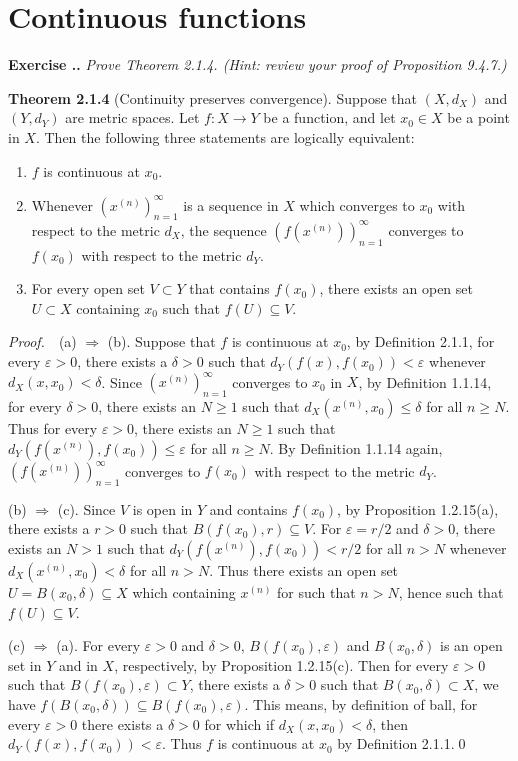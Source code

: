 \documentclass{book}
\newcommand{\pff}{\vspace{.25em}\noindent\emph{Proof.}~~}
\newcommand{\titl}[1]{\noindent\textbf{#1}}
\newcounter{Exercise}[section]
\renewcommand{\theExercise}{\thesection.\arabic{Exercise}.}
\newcommand{\new}{\vspace{1.5em}\noindent\textbf{Exercise \stepcounter{Exercise}\textbf{\theExercise}} }
\begin{document}
\section{Continuous functions}

\new\emph{Prove Theorem 2.1.4. (Hint: review your proof of Proposition 9.4.7.)}

\begin{framed}
\titl{Theorem 2.1.4} (Continuity preserves convergence). Suppose that $(X,d_X)$ and $(Y,d_Y)$ are metric spaces. Let $f:X\to Y$ be a function, and let $x_0\in X$ be a point in $X$. Then the following three statements are logically equivalent:
\begin{enumerate}
    \item $f$ is continuous at $x_0$.
    \item Whenever $(x^{(n)})_{n=1}^{\infty}$ is a sequence in $X$ which converges to $x_0$ with respect to the metric $d_X$, the sequence $(f(x^{(n)}))_{n=1}^{\infty}$ converges to $f(x_0)$ with respect to the metric $d_Y$.
    \item For every open set $V\subset Y$ that contains $f(x_0)$, there exists an open set $U\subset X$ containing $x_0$ such that $f(U)\subseteq V$.
\end{enumerate}
\end{framed}

\pff (a) $\Rightarrow$ (b). Suppose that $f$ is continuous at $x_0$, by Definition 2.1.1, for every $\varepsilon>0$, there exists a $\delta>0$ such that $d_Y(f(x),f(x_0))<\varepsilon$ whenever $d_X(x,x_0)<\delta$. Since $(x^{(n)})_{n=1}^{\infty}$ converges to $x_0$ in $X$, by Definition 1.1.14, for every $\delta>0$, there exists an $N\geq 1$ such that $d_X(x^{(n)},x_0)\leq\delta$ for all $n\geq N$. Thus for every $\varepsilon>0$, there exists an $N\geq 1$ such that $d_Y(f(x^{(n)}),f(x_0))\leq\varepsilon$ for all $n\geq N$. By Definition 1.1.14 again, $(f(x^{(n)}))_{n=1}^{\infty}$ converges to $f(x_0)$ with respect to the metric $d_Y$.

(b) $\Rightarrow$ (c). Since $V$ is open in $Y$ and contains $f(x_0)$, by Proposition 1.2.15(a), there exists a $r>0$ such that $B(f(x_0),r)\subseteq V$. For $\varepsilon=r/2$ and $\delta>0$, there exists an $N>1$ such that $d_Y(f(x^{(n)}),f(x_0))<r/2$ for all $n>N$ whenever $d_X(x^{(n)},x_0)<\delta$ for all $n>N$. Thus there exists an open set $U=B(x_0,\delta)\subseteq X$ which containing $x^{(n)}$ for such that $n>N$, hence such that $f(U)\subseteq V$.

(c) $\Rightarrow$ (a). For every $\varepsilon>0$ and $\delta>0$, $B(f(x_0),\varepsilon)$ and $B(x_0,\delta)$ is an open set in $Y$ and in $X$, respectively, by Proposition 1.2.15(c). Then for every $\varepsilon>0$ such that $B(f(x_0),\varepsilon)\subset Y$, there exists a $\delta>0$ such that $B(x_0,\delta)\subset X$, we have $f(B(x_0,\delta))\subseteq B(f(x_0),\varepsilon)$. This means, by definition of ball, for every $\varepsilon>0$ there exists a $\delta>0$ for which if $d_X(x,x_0)<\delta$, then $d_Y(f(x),f(x_0))<\varepsilon$. Thus $f$ is continuous at $x_0$ by Definition 2.1.1.\qed
\end{document}

